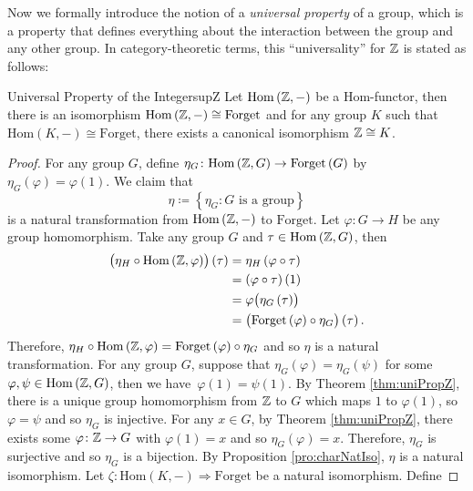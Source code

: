 \documentclass[math]{amznotes}
\theoremstyle{remark}
\newcommand{\Forget}{\mathrm{Forget}}
\newcommand{\0}{\mathbf{0}}
\newcommand{\1}{\mathbf{1}}
\begin{document}
Now we formally introduce the notion of a \textit{universal property} of a group, which is a property that defines everything about the interaction between the group and any other group. In category-theoretic terms, this ``universality'' for $\mathbb{Z}$ is stated as follows:
\begin{thmbox}{Universal Property of the Integers}{upZ}
    Let $\mathrm{Hom}\left(\mathbb{Z}, -\right)$ be a $\mathrm{Hom}$-functor, then there is an isomorphism $\mathrm{Hom}\left(\mathbb{Z}, -\right) \cong \mathrm{Forget}$ and for any group $K$ such that $\mathrm{Hom}\left(K, -\right) \cong \mathrm{Forget}$, there exists a canonical isomorphism $\mathbb{Z} \cong K$.
    \tcblower
    \begin{proof}
        For any group $G$, define $\eta_G \colon \mathrm{Hom}\left(\mathbb{Z}, G\right) \to \mathrm{Forget}\left(G\right)$ by $\eta_G\left(\varphi\right) = \varphi\left(1\right)$. We claim that 
        \begin{equation*}
            \eta \coloneqq \left\{\eta_G \colon G \textrm{ is a group}\right\}
        \end{equation*}
        is a natural transformation from $\mathrm{Hom}\left(\mathbb{Z}, -\right)$ to $\mathrm{Forget}$. Let $\varphi \colon G \to H$ be any group homomorphism. Take any group $G$ and $\tau \in \mathrm{Hom}\left(\mathbb{Z}, G\right)$, then 
        \begin{align*}
            \bigl(\eta_H \circ \mathrm{Hom}\left(\mathbb{Z}, \varphi\right)\bigr)\left(\tau\right) & = \eta_H\left(\varphi \circ \tau\right) \\
            & = \left(\varphi \circ \tau\right)\left(1\right) \\
            & = \varphi\bigl(\eta_G\left(\tau\right)\bigr) \\
            & = \bigl(\mathrm{Forget}\left(\varphi\right) \circ \eta_G\bigr)\left(\tau\right).
        \end{align*}
        Therefore, $\eta_H \circ \mathrm{Hom}\left(\mathbb{Z}, \varphi\right) = \mathrm{Forget}\left(\varphi\right) \circ \eta_G$ and so $\eta$ is a natural transformation. For any group $G$, suppose that $\eta_G\left(\varphi\right) = \eta_G\left(\psi\right)$ for some $\varphi, \psi \in \mathrm{Hom}\left(\mathbb{Z}, G\right)$, then we have~$\varphi\left(1\right) = \psi\left(1\right)$. By Theorem \ref{thm:uniPropZ}, there is a unique group homomorphism from $\mathbb{Z}$ to $G$ which maps $1$ to $\varphi\left(1\right)$, so $\varphi = \psi$ and so $\eta_G$ is injective. For any $x \in G$, by Theorem \ref{thm:uniPropZ}, there exists some $\varphi \colon \mathbb{Z} \to G$ with $\varphi\left(1\right) = x$ and so $\eta_G\left(\varphi\right) = x$. Therefore, $\eta_G$ is surjective and so $\eta_G$ is a bijection. By Proposition \ref{pro:charNatIso}, $\eta$ is a natural isomorphism. Let $\zeta \colon \mathrm{Hom}\left(K, -\right) \Rightarrow \Forget$ be a natural isomorphism. Define 

\end{proof}
\end{thmbox}
\end{document}
